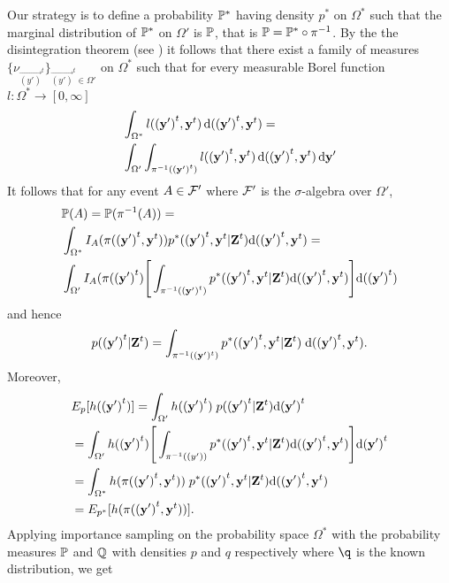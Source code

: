 Our strategy is to define a probability $\P^*$ having density $p^*$ on $\Omega^*$ such that the marginal distribution of $\P^*$ on $\Omega'$ is $\P$, that is $\P = \P^* \circ \pi^{-1}$. By the the disintegration theorem (see \cite{Rohlin}) it follows that there exist a family of measures $\{ \nu_{\vec{(y')}^t} \}_{\vec{(y')}^t \in \Omega'}$ on $\Omega^*$ such that for every measurable Borel function $l:\Omega^* \rightarrow [0, \infty]$
\begin{align*}
    &\int_{\Omega^*} l(\vec{(y')}^t, \vec{y}^t)\diff (\vec{(y')}^t,\vec{y}^t) = \\
    & \int_{\Omega'}\int_{\pi^{-1}(\vec{(y')}^t)} l(\vec{(y')}^t, \vec{y}^t) \diff (\vec{(y')}^t, \vec{y}^t) \diff \vec{\vec{y'}}
\end{align*}
It follows that for any event $A \in \F'$ where $\F'$ is the $\sigma$-algebra over $\Omega'$,
\begin{align*}
    &\P(A) = \P(\pi^{-1}(A)) = \\
    &\int_{\Omega^*} I_A(\pi(\vec{(y')}^t, \vec{y}^t)) p^*(\vec{(y')}^t, \vec{y}^t | \vec{Z}^t) \D (\vec{(y')}^t, \vec{y}^t) = \\
    & \int_{\Omega'} I_A(\pi(\vec{(y')}^t) \Bigg[ \int_{\pi^{-1}(\vec{(y')}^t)} p^*(\vec{(y')}^t, \vec{y}^t | \vec{Z}^t) \D (\vec{(y')}^t, \vec{y}^t) \Bigg] \D (\vec{(y')}^t)
\end{align*}
and hence
\begin{equation*}
    p(\vec{(y')}^t | \vec{Z}^t) = \int_{\pi^{-1}((\vec{y}')^t)} p^*(\vec{(y')}^t, \vec{y}^t | \vec{Z}^t)\; \D (\vec{(y')}^t, \vec{y}^t).
\end{equation*}
Moreover,
\begin{align*}
    &E_{p}[h(\vec{(y')}^{t})]  = \int_{\Omega'} h(\vec{(y')}^{t})\; p(\vec{(y')}^{t} | \vec{Z}^{t}) \D \vec{(y')}^{t} \\
    &= \int_{\Omega'} h(\vec{(y')}^{t})\Bigg[\int_{\pi^{-1}(\vec(y'))} p^*(\vec{(y')}^{t}, \vec{y}^{t} | \vec{Z}^{t}) \D (\vec{(y')}^t, \vec{y}^t) \Bigg] \D \vec{(y')}^{t} \\ 
    &= \int_{\Omega^*} h(\pi(\vec{(y')}^{t}, \vec{y}^{t}))\; p^*(\vec{(y')}^{t}, \vec{y}^{t} | \vec{Z}^{t}) \D (\vec{(y')}^t, \vec{y}^t) \\ 
    &= E_{p^*}[h(\pi (\vec{(y')}^{t}, \vec{y}^{t}))].
\end{align*}
Applying importance sampling on the probability space $\Omega^*$ with the probability measures $\P$ and $\Q$ with densities $p$ and $q$ respectively where $\q$ is the known distribution, we get
